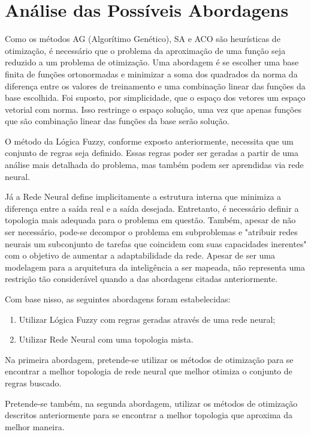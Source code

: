 \chapter{Análise das Possíveis Abordagens}

Como os métodos AG (Algorítimo Genético),
SA e ACO são heurísticas de otimização, é necessário que o problema da aproximação
de uma função seja reduzido a um problema de otimização. Uma abordagem é se escolher uma
base finita de funções ortonormadas e minimizar a soma dos quadrados da norma da diferença
entre os valores de treinamento e uma combinação linear das funções da base escolhida.
Foi suposto, por simplicidade, que o espaço dos vetores um espaço vetorial com norma. Isso restringe o
espaço solução, uma vez que apenas funções que são combinação linear das funções da base serão solução.

O método da Lógica Fuzzy, conforme exposto anteriormente, necessita que um conjunto de regras seja definido.
Essas regras poder ser geradas a partir de uma análise mais detalhada do problema, mas também podem ser
aprendidas via rede neural.

Já a Rede Neural define implicitamente a estrutura interna
que minimiza a diferença entre a saída real e a saída desejada.
Entretanto, é necessário definir a topologia mais adequada para o
problema em questão. Também, apesar de não ser necessário, pode-se
decompor o problema em subproblemas e "atribuir redes neurais um
subconjunto de tarefas que coincidem com suas capacidades
inerentes" \cite[pag. 29]{haykin2001redes} com o objetivo de aumentar a
adaptabilidade da rede. Apesar de ser uma modelagem para a arquitetura
da inteligência a ser mapeada, não representa uma restrição tão
considerável quando a das abordagens citadas anteriormente.

Com base nisso, as seguintes abordagens foram estabelecidas:

\begin{enumerate}
 \item Utilizar Lógica Fuzzy com regras geradas através de uma rede neural;
 \item Utilizar Rede Neural com uma topologia mista.
\end{enumerate}

Na primeira abordagem, pretende-se utilizar os métodos de otimização para se
encontrar a melhor topologia de rede neural que melhor otimiza o conjunto de
regras buscado.

Pretende-se também, na segunda abordagem, utilizar os métodos de otimização
descritos anteriormente para se encontrar a melhor topologia que aproxima da
melhor maneira.
